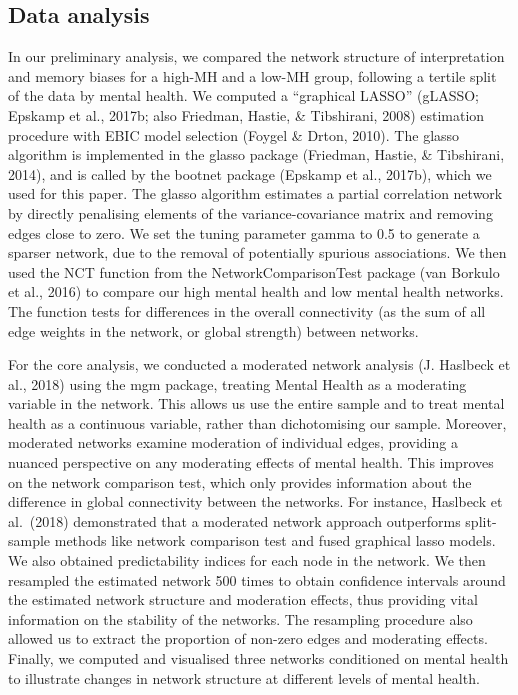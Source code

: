 \documentclass[man,floatsintext]{apa6}
\begin{document}
\hypertarget{data-analysis}{%
\subsection{Data analysis}\label{data-analysis}}

In our preliminary analysis, we compared the network structure of interpretation and memory biases for a high-MH and a low-MH group, following a tertile split of the data by mental health. We computed a \enquote{graphical LASSO} (gLASSO; Epskamp et al., 2017b; also Friedman, Hastie, \& Tibshirani, 2008) estimation procedure with EBIC model selection (Foygel \& Drton, 2010). The glasso algorithm is implemented in the glasso package (Friedman, Hastie, \& Tibshirani, 2014), and is called by the bootnet package (Epskamp et al., 2017b), which we used for this paper. The glasso algorithm estimates a partial correlation network by directly penalising elements of the variance-covariance matrix and removing edges close to zero. We set the tuning parameter gamma to 0.5 to generate a sparser network, due to the removal of potentially spurious associations. We then used the NCT function from the NetworkComparisonTest package (van Borkulo et al., 2016) to compare our high mental health and low mental health networks. The function tests for differences in the overall connectivity (as the sum of all edge weights in the network, or global strength) between networks.

For the core analysis, we conducted a moderated network analysis (J. Haslbeck et al., 2018) using the mgm package, treating Mental Health as a moderating variable in the network. This allows us use the entire sample and to treat mental health as a continuous variable, rather than dichotomising our sample. Moreover, moderated networks examine moderation of individual edges, providing a nuanced perspective on any moderating effects of mental health. This improves on the network comparison test, which only provides information about the difference in global connectivity between the networks. For instance, Haslbeck et al.~(2018) demonstrated that a moderated network approach outperforms split-sample methods like network comparison test and fused graphical lasso models. We also obtained predictability indices for each node in the network. We then resampled the estimated network 500 times to obtain confidence intervals around the estimated network structure and moderation effects, thus providing vital information on the stability of the networks. The resampling procedure also allowed us to extract the proportion of non-zero edges and moderating effects. Finally, we computed and visualised three networks conditioned on mental health to illustrate changes in network structure at different levels of mental health.
\end{document}
